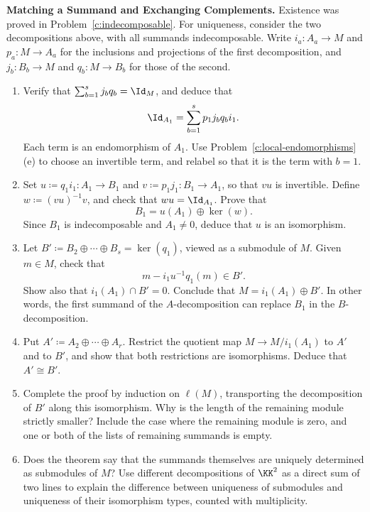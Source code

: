 \documentclass[12pt,reqno]{amsart}
\begin{document}
\begin{problems}
\item\label{c:krull-schmidt} \textbf{Matching a Summand and Exchanging Complements.} Existence was proved in Problem~\ref{c:indecomposable}. For uniqueness, consider the two decompositions above, with all summands indecomposable. Write $i_a:A_a\to M$ and $p_a:M\to A_a$ for the inclusions and projections of the first decomposition, and $j_b:B_b\to M$ and $q_b:M\to B_b$ for those of the second.
\begin{enumerate}
\item Verify that $\sum_{b=1}^sj_bq_b=\Id_M$, and deduce that
\[
\Id_{A_1}=\sum_{b=1}^sp_1j_bq_bi_1.
\]
Each term is an endomorphism of $A_1$. Use Problem~\ref{c:local-endomorphisms}(e) to choose an invertible term, and relabel so that it is the term with $b=1$.
\item Set $u\coloneqq q_1i_1:A_1\to B_1$ and $v\coloneqq p_1j_1:B_1\to A_1$, so that $vu$ is invertible. Define $w\coloneqq(vu)^{-1}v$, and check that $wu=\Id_{A_1}$. Prove that
\[
B_1=u(A_1)\oplus\ker(w).
\]
Since $B_1$ is indecomposable and $A_1\ne0$, deduce that $u$ is an isomorphism.
\item Let $B'\coloneqq B_2\oplus\cdots\oplus B_s=\ker(q_1)$, viewed as a submodule of $M$. Given $m\in M$, check that
\[
m-i_1u^{-1}q_1(m)\in B'.
\]
Show also that $i_1(A_1)\cap B'=0$. Conclude that $M=i_1(A_1)\oplus B'$. In other words, the first summand of the $A$-decomposition can replace $B_1$ in the $B$-decomposition.
\item Put $A'\coloneqq A_2\oplus\cdots\oplus A_r$. Restrict the quotient map $M\to M/i_1(A_1)$ to $A'$ and to $B'$, and show that both restrictions are isomorphisms. Deduce that $A'\cong B'$.
\item Complete the proof by induction on $\ell(M)$, transporting the decomposition of $B'$ along this isomorphism. Why is the length of the remaining module strictly smaller? Include the case where the remaining module is zero, and one or both of the lists of remaining summands is empty.
\item Does the theorem say that the summands themselves are uniquely determined as submodules of $M$? Use different decompositions of $\KK^2$ as a direct sum of two lines to explain the difference between uniqueness of submodules and uniqueness of their isomorphism types, counted with multiplicity.
\end{enumerate}
\end{problems}
\end{document}
